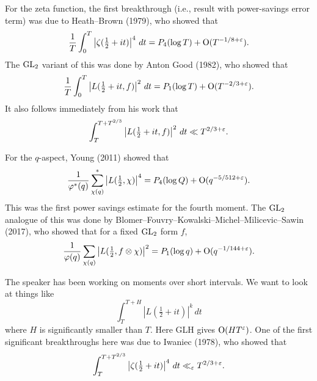 \documentclass[reqno]{amsart} 
\begin{document}
For the zeta function, the first breakthrough (i.e., result with power-savings error term) was due to Heath--Brown (1979), who showed that
\begin{equation*}
  \frac{1}{T} \int_0^T
  \left\lvert \zeta (\tfrac{1}{2} + i t) \right\rvert^4
  \, d t
  = P_4 (\log T)
  + \operatorname{O} ( T^{-1/8 + \varepsilon} ).
\end{equation*}
The $\operatorname{GL}_2$ variant of this was done by Anton Good (1982), who showed that
\begin{equation*}
  \frac{1}{T} \int_0^T \left\lvert L (\tfrac{1}{2} + i t, f) \right\rvert^2 \, d t
  = P_1 (\log T) + \operatorname{O}(T^{- 2/3 + \varepsilon}).
\end{equation*}
It also follows immediately from his work that
\begin{equation*}
  \int_T^{T + T^{2/3} }
  \left\lvert L (\tfrac{1}{2} + i t, f) \right\rvert^2 \, d t
  \ll T^{2/3 + \varepsilon}.
\end{equation*}

For the $q$-aspect, Young (2011) showed that
\begin{equation*}
  \frac{1}{ \varphi^\ast (q)}
  \sum_{\chi (q)}^\ast \left\lvert L (\tfrac{1}{2}, \chi ) \right\rvert^4
  = P_4 (\log Q) + \operatorname{O}(q^{- 5/512 + \varepsilon }).
\end{equation*}
This was the first power savings estimate for the fourth moment.  The $\operatorname{GL}_2$ analogue of this was done by Blomer--Fouvry--Kowalski--Michel--Milicevic--Sawin (2017), who showed that for a fixed $\operatorname{GL}_2$ form $f$,
\begin{equation*}
  \frac{1}{\varphi (q)}
  \sum_{\chi (q)}
  \left\lvert
    L (\tfrac{1}{2}, f \otimes \chi  )\right\rvert^2
  =
  P_1 (\log q) + \operatorname{O}(q^{- 1/144 + \varepsilon }).
\end{equation*}

The speaker has been working on moments over short intervals.  We want to look at things like
\begin{equation*}
  \int_T^{T + H } \left\lvert L (\tfrac{1}{2} + i t ) \right\rvert^k \, d t
\end{equation*}
where $H$ is significantly smaller than $T$.  Here GLH gives $\operatorname{O}(H T^\varepsilon )$.  One of the first significant breakthroughs here was due to Iwaniec (1978), who showed that
\begin{equation*}
  \int_T^{T + T^{2/3} }
  \left\lvert \zeta (\tfrac{1}{2} + i t ) \right\rvert^4 \, d t
  \ll_\varepsilon T^{2/3 + \varepsilon}.
\end{equation*}
\end{document}
